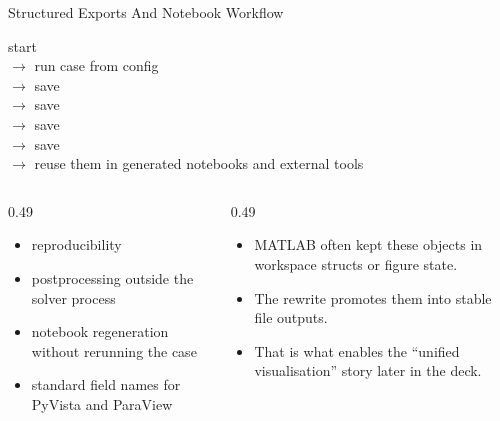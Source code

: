 \documentclass[aspectratio=169,10pt]{beamer}
\begin{document}
\begin{frame}{Structured Exports And Notebook Workflow}
\small
\begin{pseudobox}
start\\
$\rightarrow$ run case from config\\
$\rightarrow$ save \\
$\rightarrow$ save \\
$\rightarrow$ save \\
$\rightarrow$ save \\
$\rightarrow$ reuse them in generated notebooks and external tools
\end{pseudobox}
\vspace{0.16cm}
\begin{columns}[T,totalwidth=\textwidth]
\begin{column}{0.49\textwidth}
\begin{softbox}
\begin{itemize}
  \item reproducibility
  \item postprocessing outside the solver process
  \item notebook regeneration without rerunning the case
  \item standard field names for PyVista and ParaView
\end{itemize}
\end{softbox}
\end{column}
\begin{column}{0.49\textwidth}
\begin{softbox}
\begin{itemize}
  \item MATLAB often kept these objects in workspace structs or figure state.
  \item The rewrite promotes them into stable file outputs.
  \item That is what enables the ``unified visualisation'' story later in the deck.
\end{itemize}
\end{softbox}
\end{column}
\end{columns}
\end{frame}
\end{document}
